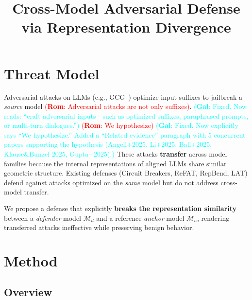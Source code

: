 \documentclass[11pt]{article}
\title{Cross-Model Adversarial Defense via Representation Divergence}
\author{}
\date{}
\newcommand\rom[1]{\textcolor{red}{(\textbf{Rom}: #1)}} %
\newcommand\gal[1]{\textcolor{cyan}{(\textbf{Gal}: #1)}} %
\begin{document}
\maketitle

\section{Threat Model}

Adversarial attacks on LLMs (e.g., GCG~\cite{zou2023universal}) optimize input suffixes to jailbreak a \emph{source} model \rom{Adversarial attacks are not only suffixes}. \gal{Fixed. Now reads: ``craft adversarial inputs---such as optimized suffixes, paraphrased prompts, or multi-turn dialogues.''} \rom{We hypothesize} \gal{Fixed. Now explicitly says ``We hypothesize.'' Added a ``Related evidence'' paragraph with 5 concurrent papers supporting the hypothesis (Angell+2025, Li+2025, Ball+2025, Klause\&Bunzel 2025, Gupta+2025).} These attacks \textbf{transfer} across model families because the internal representations of aligned LLMs share similar geometric structure. Existing defenses (Circuit Breakers, ReFAT, RepBend, LAT) defend against attacks optimized on the \emph{same} model but do not address cross-model transfer.

We propose a defense that explicitly \textbf{breaks the representation similarity} between a \emph{defender} model $\mathcal{M}_d$ and a reference \emph{anchor} model $\mathcal{M}_a$, rendering transferred attacks ineffective while preserving benign behavior.

\section{Method}

\subsection{Overview}
\end{document}
